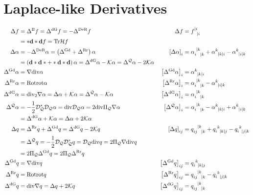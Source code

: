 \documentclass[a4paper,7pt]{scrartcl}
\newcommand{\gauss}{\mathcal{K}}
\newcommand{\exd}{\mathbf{d}}
\newcommand{\Tr}{\mathrm{Tr}}
\newcommand{\rot}{\mathrm{rot}}
\renewcommand{\div}{\mathrm{div}}
\newcommand{\Rot}{\mathrm{Rot}}
\newcommand{\dq}{\mathcal{D}_{\mathcal{Q}}}
\newcommand{\hess}{\mathcal{H}}
\newcommand{\laplace}[1]{\Delta^{#1}}
\newcommand{\lderham}{\laplace{\textup{DeR}}}
\newcommand{\ldivgrad}{\laplace{\textup{dG}}}
\newcommand{\lgraddiv}{\laplace{\textup{Gd}}}
\newcommand{\lrotrot}{\laplace{\textup{Rr}}}
\newcommand{\lbeltrami}{\laplace{\textup{B}}}
\newcommand{\lQ}{\laplace{\mathcal{Q}}}
\newcommand{\piQ}{\Pi_{\mathcal{Q}}}
\begin{document}
\section{Laplace-like Derivatives}
\begin{align*}
  \Delta f &= \lbeltrami f = \ldivgrad f= -\lderham f
        &\Delta f &= \tensor{f}{^{|i}_{|i}} \\
           &= *\exd*\exd f = \Tr\hess f\\
  \Delta\alpha &= -\lderham\alpha = \left( \lgraddiv + \lrotrot \right)\alpha 
        &\left[ \Delta\alpha \right]_{i} &= \tensor{\alpha}{_{i}^{|k}_{|k}} + \tensor{\alpha}{^{k}_{|k|i}} - \tensor{\alpha}{^{k}_{|i|k}}\\
               &= \left( \exd*\exd* + *\exd*\exd \right)\alpha
                = \ldivgrad\alpha - \gauss\alpha = \lQ\alpha - 2\gauss\alpha \\
  \lgraddiv\alpha &= \nabla\div\alpha
        &\left[ \lgraddiv\alpha \right]_{i} &= \tensor{\alpha}{^{k}_{|k|i}} \\
  \lrotrot\alpha &= \Rot\rot\alpha
        &\left[ \lrotrot\alpha \right]_{i} &= \tensor{\alpha}{_{i}^{|k}_{|k}} - \tensor{\alpha}{^{k}_{|i|k}}\\
  \ldivgrad\alpha &= \div_{2}\nabla\alpha  = \Delta\alpha + \gauss\alpha = \lQ\alpha - \gauss\alpha
        &\left[ \ldivgrad\alpha \right]_{i} &= \tensor{\alpha}{_{i}^{|k}_{|k}}\\
  \lQ\alpha &= -\frac{1}{2}\dq^{*}\dq\alpha = \div\dq\alpha = 2\div\piQ\nabla\alpha
        &\left[ \lQ\alpha \right]_{i} &=\tensor{\alpha}{_{i}^{|k}_{|k}} - \tensor{\alpha}{^{k}_{|k|i}} + \tensor{\alpha}{^{k}_{|i|k}}\\
            &= \ldivgrad\alpha + \gauss\alpha = \Delta\alpha + 2\gauss\alpha \\
  \Delta q &= \lrotrot q + \lgraddiv q = \ldivgrad q -2\gauss q 
        &\left[ \Delta q \right]_{ij} &= \tensor{q}{_{ij}^{|k}_{|k}} + \tensor{q}{_{i}^{k}_{|k|j}} - \tensor{q}{_{i}^{k}_{|j|k}}\\
           &= \lQ q = -\frac{1}{2}\dq\dq^{*} q = \dq\div q = 2\piQ\nabla\div q \\
           &=  2\piQ\lgraddiv q = 2\piQ\lrotrot q\\
  \lgraddiv q &= \nabla\div q 
           & \left[ \lgraddiv q \right]_{ij} &= \tensor{q}{_{i}^{k}_{|k|j}} \\
  \lrotrot q &= \Rot\rot q
           &\left[ \lrotrot q \right]_{ij} &= \tensor{q}{_{ij}^{|k}_{|k}} - \tensor{q}{_{i}^{k}_{|j|k}}\\
  \ldivgrad q &= \div\nabla q = \Delta q + 2\gauss q
           & \left[ \ldivgrad q \right]_{ij} &= \tensor{q}{_{ij}^{|k}_{|k}}
\end{align*}
\end{document}
